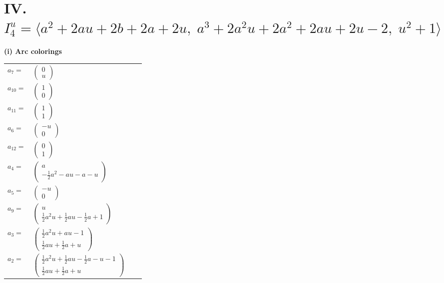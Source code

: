\documentclass[1p]{elsarticle_modified}
\theoremstyle{definition}
\begin{document}
\centering \section*{IV. $I^u_{4}= \langle a^2+2 a u+2 b+2 a+2 u,\;a^3+2 a^2 u+2 a^2+2 a u+2 u-2,\;u^2+1 \rangle$}
\flushleft \textbf{(i) Arc colorings}\\
\begin{tabular}{m{7pt} m{180pt} m{7pt} m{180pt} }
\flushright $a_{7}=$&$\begin{pmatrix}0\\u\end{pmatrix}$ \\
\flushright $a_{10}=$&$\begin{pmatrix}1\\0\end{pmatrix}$ \\
\flushright $a_{11}=$&$\begin{pmatrix}1\\1\end{pmatrix}$ \\
\flushright $a_{6}=$&$\begin{pmatrix}- u\\0\end{pmatrix}$ \\
\flushright $a_{12}=$&$\begin{pmatrix}0\\1\end{pmatrix}$ \\
\flushright $a_{4}=$&$\begin{pmatrix}a\\-\frac{1}{2} a^2- a u- a- u\end{pmatrix}$ \\
\flushright $a_{5}=$&$\begin{pmatrix}- u\\0\end{pmatrix}$ \\
\flushright $a_{9}=$&$\begin{pmatrix}u\\\frac{1}{2} a^2 u+\frac{1}{2} a u-\frac{1}{2} a+1\end{pmatrix}$ \\
\flushright $a_{3}=$&$\begin{pmatrix}\frac{1}{2} a^2 u+a u-1\\\frac{1}{2} a u+\frac{1}{2} a+u\end{pmatrix}$ \\
\flushright $a_{2}=$&$\begin{pmatrix}\frac{1}{2} a^2 u+\frac{1}{2} a u-\frac{1}{2} a- u-1\\\frac{1}{2} a u+\frac{1}{2} a+u\end{pmatrix}$ \\

\end{tabular}
\end{document}
